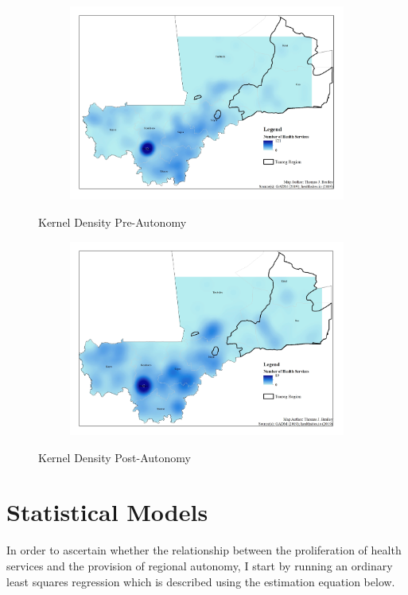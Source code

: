 \documentclass[12pt]{article}
\begin{document}
\begin{figure}
\centering
\begin{subfigure}{.8\textwidth}
  \centering
  \includegraphics[width=1\linewidth]{tjbrailey_final_project_map_health_kernel_pre.jpg}
\end{subfigure}%
\caption{Kernel Density Pre-Autonomy}
\end{figure}
\begin{figure}
\centering
\begin{subfigure}{.8\textwidth}
  \centering
  \includegraphics[width=1\linewidth]{tjbrailey_final_project_map_health_kernel_post.jpg}
\end{subfigure}%
\caption{Kernel Density Post-Autonomy}
\end{figure}

\section{Statistical Models}
In order to ascertain whether the relationship between the proliferation of health services and the provision of regional autonomy, I start by running an ordinary least squares regression which is described using the estimation equation below. 
\end{document}
